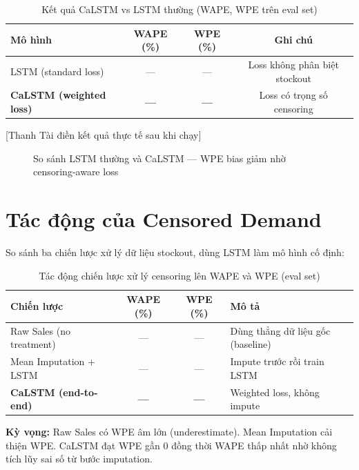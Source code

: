 \documentclass[12pt,a4paper]{report}
\begin{document}
\begin{table}[H]
\centering
\caption{Kết quả CaLSTM vs LSTM thường (WAPE, WPE trên eval set)}
\begin{tabular}{lccc}
\toprule
\textbf{Mô hình} & \textbf{WAPE (\%)} & \textbf{WPE (\%)} & \textbf{Ghi chú} \\
\midrule
LSTM (standard loss)   & --- & --- & Loss không phân biệt stockout \\
\textbf{CaLSTM (weighted loss)} & \textbf{---} & \textbf{---} & Loss có trọng số censoring \\
\bottomrule
\end{tabular}
\end{table}

[Thanh Tài điền kết quả thực tế sau khi chạy]

\begin{figure}[H]
    \centering
    \caption{So sánh LSTM thường và CaLSTM --- WPE bias giảm nhờ censoring-aware loss}
\end{figure}

\section{Tác động của Censored Demand}

So sánh ba chiến lược xử lý dữ liệu stockout, dùng LSTM làm mô hình cố định:

\begin{table}[H]
\centering
\caption{Tác động chiến lược xử lý censoring lên WAPE và WPE (eval set)}
\begin{tabular}{lccp{5cm}}
\toprule
\textbf{Chiến lược} & \textbf{WAPE (\%)} & \textbf{WPE (\%)} & \textbf{Mô tả} \\
\midrule
Raw Sales (no treatment) & --- & --- & Dùng thẳng dữ liệu gốc (baseline) \\
Mean Imputation + LSTM   & --- & --- & Impute trước rồi train LSTM \\
\textbf{CaLSTM (end-to-end)} & \textbf{---} & \textbf{---} & Weighted loss, không impute \\
\bottomrule
\end{tabular}
\end{table}

\textbf{Kỳ vọng:} Raw Sales có WPE âm lớn (underestimate). Mean Imputation cải thiện WPE. CaLSTM đạt WPE gần $0$ đồng thời WAPE thấp nhất nhờ không tích lũy sai số từ bước imputation.
\end{document}
